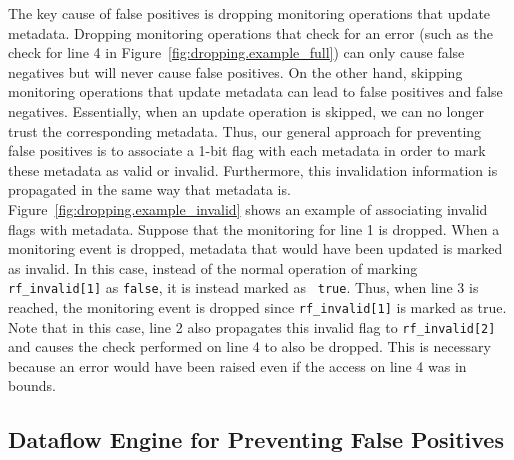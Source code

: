 The key cause of false positives is dropping monitoring operations that update
metadata. Dropping monitoring operations that check for an error (such as the check
for line 4 in Figure~\ref{fig:dropping.example_full}) can only cause
false negatives but will never cause false positives. On the other hand,
skipping monitoring operations that update metadata can lead to false positives
and false negatives.
Essentially, when an update operation is skipped, we can no longer trust the
corresponding metadata. Thus, our general approach for preventing false
positives is to associate a 1-bit flag with each metadata in order to mark these
metadata as valid or
invalid. Furthermore, this invalidation information is propagated in the same
way that metadata is. Figure~\ref{fig:dropping.example_invalid}
shows an example of associating invalid flags with metadata. Suppose that the monitoring for
line 1 is dropped. When a monitoring event is dropped, metadata that would have
been updated is marked as invalid. In this case, instead of the normal
operation of marking {\tt rf\_invalid[1]} as {\tt false}, it is instead
marked as {\tt
true}. Thus, when line 3 is reached, the monitoring event is dropped
since {\tt rf\_invalid[1]} is marked as true. Note that in this case, line 2
also propagates this invalid flag to {\tt rf\_invalid[2]} and causes the check
performed on line 4 to also be dropped. This is necessary because an error
would have been raised even if the access on line 4 was in bounds.

\subsection{Dataflow Engine for Preventing False Positives}
\label{sec:dropping.arch}

